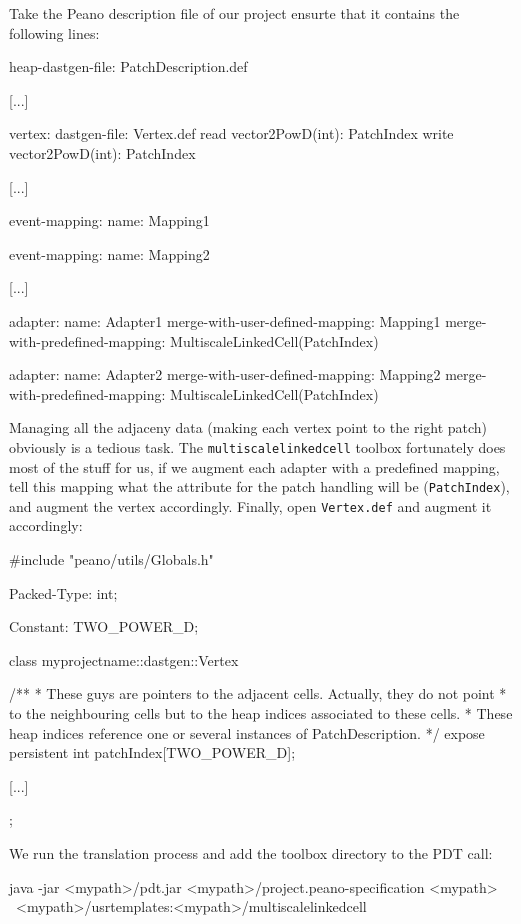 Take the Peano description file of our project ensurte that it contains the
following lines:
\begin{code}
heap-dastgen-file: PatchDescription.def

[...]

vertex:
  dastgen-file: Vertex.def
  read vector2PowD(int): PatchIndex
  write vector2PowD(int): PatchIndex
  
[...]

event-mapping:
  name: Mapping1


event-mapping:
  name: Mapping2
  
[...]

adapter:
  name: Adapter1
  merge-with-user-defined-mapping: Mapping1
  merge-with-predefined-mapping: MultiscaleLinkedCell(PatchIndex)

adapter:
  name: Adapter2
  merge-with-user-defined-mapping: Mapping2
  merge-with-predefined-mapping: MultiscaleLinkedCell(PatchIndex)
\end{code}

Managing all the adjaceny data (making each vertex point to the right patch)
obviously is a tedious task.
The \texttt{multiscalelinkedcell} toolbox fortunately does most of the stuff for
us, if we augment each adapter with a predefined mapping, tell this mapping what
the attribute for the patch handling will be (\texttt{PatchIndex}), and augment
the vertex accordingly. 
Finally, open \texttt{Vertex.def} and augment it accordingly:

\begin{code}
#include "peano/utils/Globals.h"

Packed-Type:  int;

Constant: TWO_POWER_D;

class myprojectname::dastgen::Vertex {
  /**
   * These guys are pointers to the adjacent cells. Actually, they do not point 
   * to the neighbouring cells but to the heap indices associated to these cells.
   * These heap indices reference one or several instances of PatchDescription.
   */
  expose persistent int patchIndex[TWO_POWER_D];  
  
  [...]
};
\end{code}

We run the translation process and add the toolbox directory to the PDT call:
\begin{code}
 java -jar <mypath>/pdt.jar <mypath>/project.peano-specification <mypath> \
 <mypath>/usrtemplates:<mypath>/multiscalelinkedcell
\end{code}


